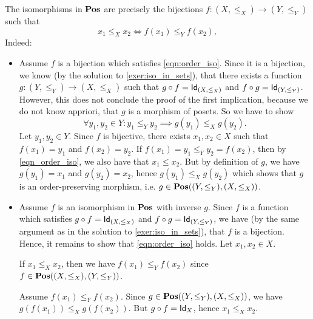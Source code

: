 \begin{solution}\label{sol:iso_in_pos}
The isomorphisms in $\POS$ are precisely the bijections $f:(X,\leq_X) \to (Y,\leq_Y)$ such that 
\begin{equation}\label{eqn:order_iso}
x_1 \leq_X x_2 \iff f(x_1) \leq_Y f(x_2),
\end{equation}
Indeed:
\begin{itemize}
\item Assume $f$ is a bijection which satisfies \cref{eqn:order_iso}. Since it is a bijection, we know (by the solution to \cref{exer:iso_in_sets}), that there exists a function $g:(Y,\leq_Y)\to (X,\leq_X)$ such that $\co{f}{g}=\Id[(X,\leq_X)]$ and $\co{g}{f}=\Id[(Y,\leq_Y)]$. However, this does not conclude the proof of the first implication, because we do not know appriori, that $g$ is a morphism of posets. So we have to show
\[
\forall y_1,y_2\in Y: y_1\leq_Y y_2 \implies g(y_1)\leq_X g(y_2).
\]
Let $y_1,y_2\in Y$. Since $f$ is bijective, there exists $x_1,x_2 \in X$ such that $f(x_1)=y_1$ and $f(x_2)=y_2$. If $f(x_1) = y_1\leq_Y y_2 = f(x_2)$, then by \cref{eqn_order_iso}, we also have that $x_1 \leq x_2$. But by definition of $g$, we have $g(y_1)=x_1$ and $g(y_2)=x_2$, hence $g(y_1)\leq_X g(y_2)$ which shows that $g$ is an order-preserving morphism, i.e. $g \in \CHom{\POS}{(Y,\leq_Y)}{(X,\leq_X)}$.
\item Assume $f$ is an isomorphism in $\POS$ with inverse $g$. Since $f$ is a function which satisfies $\co{f}{g}=\Id[(X,\leq_X)]$ and $\co{g}{f}=\Id[(Y,\leq_Y)]$, we have (by the same argument as in the solution to \cref{exer:iso_in_sets}), that $f$ is a bijection. Hence, it remains to show that \cref{eqn:order_iso} holds. Let $x_1,x_2\in X$.
  
  If $x_1\leq_X x_2$, then we have $f(x_1)\leq_Y f(x_2)$ since $f \in\CHom{\POS}{(X,\leq_X)}{(Y,\leq_Y)}$.
  
Assume $f(x_1)\leq_Y f(x_2)$. Since $g \in\CHom{\POS}{(Y,\leq_Y)}{(X,\leq_X)}$, we have $g(f(x_1)) \leq_X g(f(x_2))$. But $\co{f}{g} = \Id[X]$, hence $x_1 \leq_X x_2$.
\end{itemize}
\end{solution}

